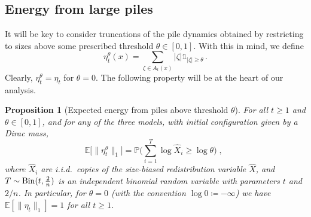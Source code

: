 \documentclass[11pt,reqno]{amsart}
\newtheorem{proposition}[theorem]{Proposition}
\theoremstyle{remark}
\theoremstyle{definition}
\numberwithin{equation}{section}
\numberwithin{figure}{section}
\newcommand{\E}{\mathds{E}}
\renewcommand{\P}{\mathds{P}}
\newcommand{\comma}{\; \text{,}\;\;}
\newcommand{\eqdef}{\coloneqq}
\newcommand{\car}{\mathds{1}}
\begin{document}
\subsection{Energy from large piles} It will be key to consider truncations of the pile dynamics obtained by restricting to sizes above  some prescribed threshold $\theta\in[0,1]$. With this in mind, we define
	\begin{equation}
		\eta^\theta_t(x)=\sum_{\zeta\in A_t(x)}|\zeta|\car_{|\zeta|\ge \theta}\,.
	\end{equation}
Clearly, $\eta_t^{\theta}=\eta_t$ for $\theta=0$. The following property will be at the heart of our analysis.
	\begin{proposition}[Expected energy from piles above threshold $\theta$]\label{lemma:size-pile}
		For all $t\ge 1$ and $\theta\in [0,1]$,  and for any of the three models, with initial configuration given by a Dirac mass,
		\begin{equation}\label{eq:size-pile}
			\E\big[\|\eta^\theta_t\|_1\big]= \P\bigg(\textstyle{\sum_{i=1}^T}  \log \hat X_i \ge \log \theta\bigg)\comma 
		\end{equation}
		where $\hat X_i$ are i.i.d.\ copies of the size-biased redistribution variable $\hat X$, and $T\sim {\rm Bin}(t,\frac{2}{n})$ is an independent binomial random variable with parameters $t$ and $2/n$.   In particular, for $\theta=0$ (with the convention $\log 0\eqdef -\infty$) we have $\E[\|\eta_t\|_1]=1$ for all $t\ge 1$.
	\end{proposition}
\end{document}
